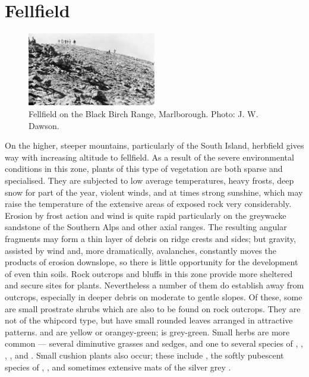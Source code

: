 \section{Fellfield}

\begin{figure}
	\includegraphics[width=0.5\textwidth]{graphics/figure105fellfield.jpg}
	\centering
	\caption[Fellfield on the Black Birch Range]{Fellfield on the Black Birch Range, Marlborough.
	Photo: J. W. Dawson.}%
	\label{fig:105fellfield}
\end{figure}

On the higher, steeper mountains, particularly of the South Island, herbfield gives way with increasing altitude to fellfield.
As a result of the severe environmental conditions in this zone, plants of this type of vegetation are both sparse and specialised.
They are subjected to low average temperatures, heavy frosts, deep snow for part of the year, violent winds, and at times strong sunshine, which may raise the temperature of the extensive areas of exposed rock very considerably.
Erosion by frost action and wind is quite rapid particularly on the greywacke sandstone of the Southern Alps and other axial ranges.
The resulting angular fragments may form a thin layer of debris on ridge crests and sides; but gravity, assisted by wind and, more dramatically, avalanches, constantly moves the products of erosion downslope, so there is little opportunity for the development of even thin soils.
Rock outcrops and bluffs in this zone provide more sheltered and secure sites for plants.
Nevertheless a number of them do establish away from outcrops, especially in deeper debris on moderate to gentle slopes.
Of these, some are small prostrate  shrubs which are also to be found on rock outcrops.
They are not of the whipcord type, but have small rounded leaves arranged in attractive patterns.  and  are yellow or orangey-green;  is grey-green.
Small herbs are more common --- several diminutive grasses and sedges, and one to several species of , , , ,  and .
Small cushion plants also occur; these include , the softly pubescent species of , , and sometimes extensive mats of the silver grey .

